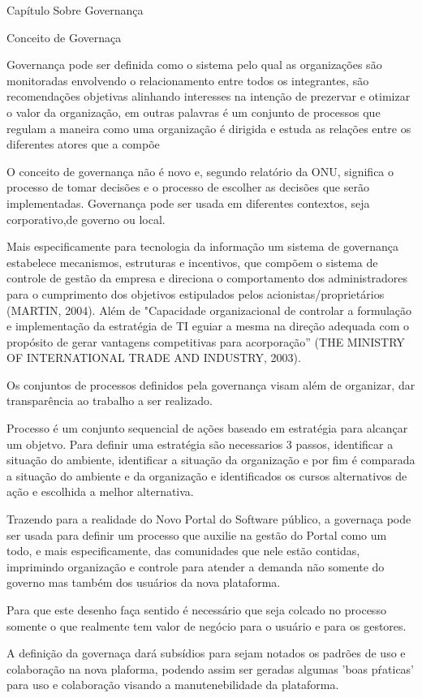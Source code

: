 Capítulo Sobre Governança

Conceito de Governaça

Governança pode ser definida como o sistema pelo qual as organizações 
são monitoradas envolvendo o relacionamento entre todos os integrantes,
são recomendações objetivas alinhando interesses na intenção de prezervar e 
otimizar o valor da organização, em outras palavras é um conjunto de processos
que regulam a maneira como uma organização é dirigida e estuda as relações entre 
os diferentes atores que a compõe

O conceito de governança não é novo e, segundo relatório da ONU, significa o processo 
de tomar decisões e o processo de escolher as decisões que serão implementadas.
%
Governança pode ser usada em diferentes contextos, seja corporativo,de governo ou 
local.

Mais especificamente para tecnologia da informação um sistema de governança
estabelece mecanismos, estruturas e incentivos, que compõem o sistema de controle de 
gestão da empresa e direciona o comportamento dos administradores para o cumprimento 
dos objetivos estipulados pelos acionistas/proprietários (MARTIN, 2004).
%
Além de "Capacidade organizacional de controlar a formulação e implementação da 
estratégia de TI eguiar a mesma na direção adequada com o propósito de gerar 
vantagens competitivas para acorporação” (THE MINISTRY OF INTERNATIONAL TRADE 
AND INDUSTRY, 2003).

Os conjuntos de processos definidos pela governança visam além de organizar, 
dar transparência ao trabalho a ser realizado.

Processo é um conjunto sequencial de ações baseado em estratégia para alcançar
um objetvo. Para definir uma estratégia são necessarios 3 passos, identificar a
situação do ambiente, identificar a situação da organização e por fim é comparada
a situação do ambiente e da organização e identificados os cursos alternativos
de ação e escolhida a melhor alternativa.  

Trazendo para a realidade do Novo Portal do Software público, a governaça pode ser usada para 
definir um processo que auxilie na gestão do Portal como um todo, e mais especificamente,
das comunidades que nele estão contidas, imprimindo organização e controle para atender 
a demanda não somente do governo mas também dos usuários da nova plataforma.

Para que este desenho faça sentido é necessário que seja colcado no processo somente o que 
realmente tem valor de negócio para o usuário e para os gestores.

A definição da governaça dará subsídios para sejam notados os padrões de uso e colaboração na
nova plaforma, podendo assim ser geradas algumas 'boas pŕaticas' para uso e colaboração
visando a manutenebilidade da plataforma.


	






